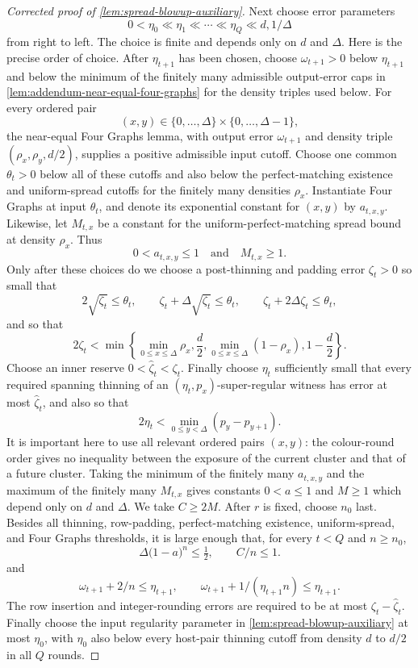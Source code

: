 \begin{proof}[Corrected proof of \cref{lem:spread-blowup-auxiliary}]
Next choose error parameters
\[
    0<\eta_0\ll\eta_1\ll\cdots\ll\eta_Q
        \ll d,1/\Delta
\]
from right to left.  The choice is finite and depends only on $d$ and
$\Delta$.  Here is the precise order of choice.  After $\eta_{t+1}$ has
been chosen, choose $\omega_{t+1}>0$ below $\eta_{t+1}$ and below the
minimum of the finitely many admissible output-error caps in
\cref{lem:addendum-near-equal-four-graphs} for the density triples used
below.  For every ordered pair
\[
    (x,y)\in\{0,\dots,\Delta\}\times\{0,\dots,\Delta-1\},
\]
the near-equal Four Graphs lemma, with output error $\omega_{t+1}$ and
density triple $(\rho_x,\rho_y,d/2)$, supplies a positive admissible input
cutoff.  Choose one common $\theta_t>0$ below all of these cutoffs and also
below the perfect-matching existence and uniform-spread cutoffs for the
finitely many densities $\rho_x$.  Instantiate Four Graphs at input
$\theta_t$, and denote its exponential constant for $(x,y)$ by
$a_{t,x,y}$.  Likewise, let $M_{t,x}$ be a constant for the
uniform-perfect-matching spread bound at density $\rho_x$.  Thus
\[
    0<a_{t,x,y}\leq1
    \quad\text{and}\quad
    M_{t,x}\geq1.
\]
Only after these choices do we choose a post-thinning and padding error
$\zeta_t>0$ so small that
\[
    2\sqrt{\zeta_t}\leq\theta_t,\qquad
    \zeta_t+\Delta\sqrt{\zeta_t}\leq\theta_t,
    \qquad \zeta_t+2\Delta\zeta_t\leq\theta_t,       \tag{A1}
\]
and so that
\[
  2\zeta_t<\min\left\{\min_{0\leq x\leq\Delta}\rho_x,
       \frac d2,\min_{0\leq x\leq\Delta}(1-\rho_x),1-\frac d2\right\}.
                                                               \tag{A2}
\]
Choose an inner reserve $0<\widehat\zeta_t<\zeta_t$.  Finally choose
$\eta_t$ sufficiently small that every required spanning thinning of an
$(\eta_t,p_x)$-super-regular witness has error at most
$\widehat\zeta_t$, and also so that
\[
  2\eta_t<\min_{0\leq y<\Delta}(p_y-p_{y+1}).
\]
It is important here to use all relevant ordered pairs
$(x,y)$: the colour-round order gives no inequality between the exposure of
the current cluster and that of a future cluster.  Taking the minimum of the
finitely many $a_{t,x,y}$ and the maximum of the finitely many $M_{t,x}$
gives constants $0<a\leq1$ and $M\geq1$ which depend only on $d$ and
$\Delta$.  We take $C\geq2M$.  After $r$ is fixed, choose $n_0$ last.
Besides all thinning, row-padding, perfect-matching existence,
uniform-spread, and Four Graphs thresholds, it is large enough that, for
every $t<Q$ and $n\geq n_0$,
\[
    \Delta\bigl(1-a\bigr)^{n}\leq\tfrac12,\qquad C/n\leq1. \tag{A3}
\]
and
\[
    \omega_{t+1}+2/n\leq\eta_{t+1},
    \qquad \omega_{t+1}+1/(\eta_{t+1}n)\leq\eta_{t+1}. \tag{A4}
\]
The row insertion and integer-rounding errors are required to be at most
$\zeta_t-\widehat\zeta_t$.  Finally choose the input regularity parameter in
\cref{lem:spread-blowup-auxiliary} at most $\eta_0$, with $\eta_0$ also
below every host-pair thinning cutoff from density $d$ to $d/2$ in all
$Q$ rounds.


\end{proof}
